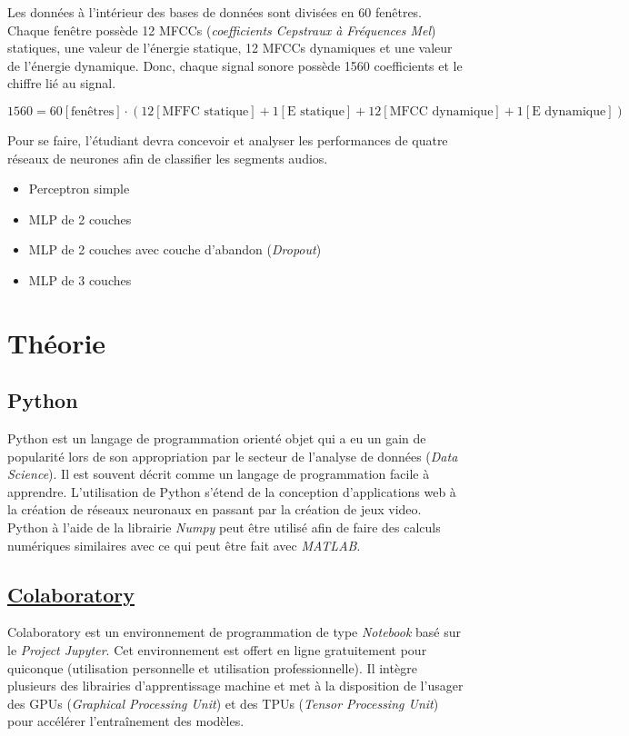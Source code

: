 \documentclass{article}
\begin{document}
\bigbreak
Les données à l'intérieur des bases de données sont divisées en 60 fenêtres. Chaque fenêtre possède 12 MFCCs (\textit{coefficients Cepstraux à Fréquences Mel}) statiques, une valeur de l'énergie statique, 12 MFCCs dynamiques et une valeur de l'énergie dynamique. Donc, chaque signal sonore possède 1560 coefficients et le chiffre lié au signal.

$$1560 = 60[\text{fenêtres}]\cdot(12[\text{MFFC statique}]+1[\text{E statique}]+12[\text{MFCC dynamique}]+1[\text{E dynamique}])$$

\bigbreak
Pour se faire, l'étudiant devra concevoir et analyser les performances de quatre réseaux de neurones afin de classifier les segments audios.
\begin{itemize}
  \item Perceptron simple
  \item MLP de 2 couches
  \item MLP de 2 couches avec couche d'abandon (\textit{Dropout})
  \item MLP de 3 couches
\end{itemize}

\section{Théorie}
\subsection{Python}
Python est un langage de programmation orienté objet qui a eu un gain de popularité lors de son appropriation par le secteur de l'analyse de données (\textit{Data Science}). Il est souvent décrit comme un langage de programmation facile à apprendre. L'utilisation de Python s'étend de la conception d'applications web à la création de réseaux neuronaux en passant par la création de jeux video. Python à l'aide de la librairie \textit{Numpy} peut être utilisé afin de faire des calculs numériques similaires avec ce qui peut être fait avec \textit{MATLAB}.
\subsection{\href{https://colab.research.google.com/}{Colaboratory}}

Colaboratory est un environnement de programmation de type \textit{Notebook} basé sur le \textit{Project Jupyter}. Cet environnement est offert en ligne gratuitement pour quiconque (utilisation personnelle et utilisation professionnelle). Il intègre plusieurs des librairies d'apprentissage machine et met à la disposition de l'usager des GPUs (\textit{Graphical Processing Unit}) et des TPUs (\textit{Tensor Processing Unit}) pour accélérer l'entraînement des modèles.
\end{document}
